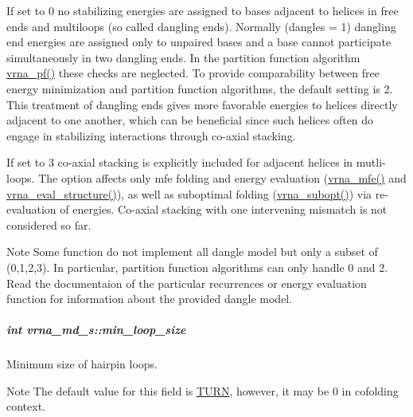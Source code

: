 If set to 0 no stabilizing energies are assigned to bases adjacent to helices in free ends and multiloops (so called dangling ends). Normally (dangles = 1) dangling end energies are assigned only to unpaired bases and a base cannot participate simultaneously in two dangling ends. In the partition function algorithm \hyperlink{group__pf__fold_ga29e256d688ad221b78d37f427e0e99bc}{vrna\-\_\-pf()} these checks are neglected. To provide comparability between free energy minimization and partition function algorithms, the default setting is 2. This treatment of dangling ends gives more favorable energies to helices directly adjacent to one another, which can be beneficial since such helices often do engage in stabilizing interactions through co-\/axial stacking.\par
If set to 3 co-\/axial stacking is explicitly included for adjacent helices in mutli-\/loops. The option affects only mfe folding and energy evaluation (\hyperlink{group__mfe__fold_gabd3b147371ccf25c577f88bbbaf159fd}{vrna\-\_\-mfe()} and \hyperlink{group__eval_ga58f199f1438d794a265f3b27fc8ea631}{vrna\-\_\-eval\-\_\-structure()}), as well as suboptimal folding (\hyperlink{group__subopt__wuchty_ga7988544ae3fc6334c1517cf76e5660aa}{vrna\-\_\-subopt()}) via re-\/evaluation of energies. Co-\/axial stacking with one intervening mismatch is not considered so far. \begin{DoxyNote}{Note}
Some function do not implement all dangle model but only a subset of (0,1,2,3). In particular, partition function algorithms can only handle 0 and 2. Read the documentaion of the particular recurrences or energy evaluation function for information about the provided dangle model. 
\end{DoxyNote}
\hypertarget{group__model__details_a9ed7ba42fcc46915c5c0c524f3d255f5}{
\subparagraph[{min\-\_\-loop\-\_\-size}]{\setlength{\rightskip}{0pt plus 5cm}int vrna\-\_\-md\-\_\-s\-::min\-\_\-loop\-\_\-size}}\label{group__model__details_a9ed7ba42fcc46915c5c0c524f3d255f5}


Minimum size of hairpin loops. 

\begin{DoxyNote}{Note}
The default value for this field is \hyperlink{energy__const_8h_ae646250fd59311356c7e5722a81c3a96}{T\-U\-R\-N}, however, it may be 0 in cofolding context. 
\end{DoxyNote}


